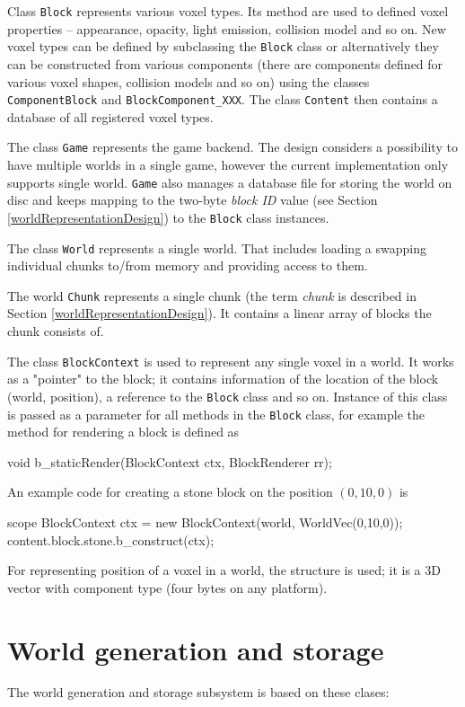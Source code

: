 Class \texttt{Block} represents various voxel types. Its method are used to defined voxel properties -- appearance, opacity, light emission, collision model and so on. New voxel types can be defined by subclassing the \texttt{Block} class or alternatively they can be constructed from various components (there are components defined for various voxel shapes, collision models and so on) using the classes \texttt{ComponentBlock} and \texttt{BlockComponent\_XXX}. The class \texttt{Content} then contains a database of all registered voxel types.

The class \texttt{Game} represents the game backend. The design considers a possibility to have multiple worlds in a single game, however the current implementation only supports single world. \texttt{Game} also manages a database file for storing the world on disc and keeps mapping to the two-byte \textit{block ID} value (see Section \ref{worldRepresentationDesign}) to the \texttt{Block} class instances.

The class \texttt{World} represents a single world. That includes loading a swapping individual chunks to/from memory and providing access to them.

The world \texttt{Chunk} represents a single chunk (the term \textit{chunk} is described in Section \ref{worldRepresentationDesign}). It contains a linear array of blocks the chunk consists of.

The class \texttt{BlockContext} is used to represent any single voxel in a world. It works as a "pointer" to the block; it contains information of the location of the block (world, position), a reference to the \texttt{Block} class and so on. Instance of this class is passed as a parameter for all methods in the \texttt{Block} class, for example the method for rendering a block is defined as
\begin{dcode}
	void b_staticRender(BlockContext ctx, BlockRenderer rr);
\end{dcode}\vspace{0mm}
An example code for creating a stone block on the position $(0,10,0)$ is
\begin{dcode}
	scope BlockContext ctx = new BlockContext(world, WorldVec(0,10,0));
	content.block.stone.b_construct(ctx);
\end{dcode}
For representing position of a voxel in a world, the structure  is used; it is a 3D vector with  component type (four bytes on any platform).

\section{World generation and storage}
The world generation and storage subsystem is based on these clases:

